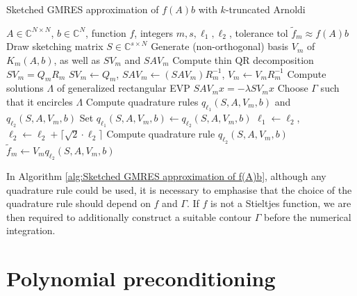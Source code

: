 \flushbottom
\begin{algorithm}[H]
    \caption{Sketched GMRES approximation of $f(A)b$ with $k$-truncated Arnoldi\cite{41}}
    \label{alg:Sketched GMRES approximation of f(A)b}
    \begin{algorithmic}[1]
        \REQUIRE $A \in \mathbb{C}^{N \times N}$, $b \in \mathbb{C}^{N}$, function $f$, integers $m, s, \ell_1, \ell_2$, tolerance $\text{tol}$
        \ENSURE $\tilde{f}_m \approx f(A)b$
        \STATE Draw sketching matrix $S \in \mathbb{C}^{s \times N}$
        \STATE Generate (non-orthogonal) basis $V_m$ of $K_m(A, b)$, as well as $SV_m$ and $SAV_m$
        \STATE Compute thin QR decomposition $SV_m = Q_mR_m$ 
        \STATE $SV_m \gets Q_m$, $SAV_m \gets (SAV_m)R_m^{-1}$, $V_m \gets V_mR_m^{-1}$ 
            \STATE Compute solutions $\Lambda$ of generalized rectangular EVP $SAV_m x = -\lambda SV_m x$
            \STATE Choose $\Gamma$ such that it encircles $\Lambda$
        \ENDIF
        \STATE Compute quadrature rules $q_{\ell_1}(S, A, V_m, b)$ and $q_{\ell_2}(S, A, V_m, b)$ 
            \STATE Set $q_{\ell_1}(S, A, V_m, b) \gets q_{\ell_2}(S, A, V_m, b)$ 
            \STATE $\ell_1 \gets \ell_2$, $\ell_2 \gets \ell_2 + \lceil \sqrt{2} \cdot \ell_2 \rceil$ 
            \STATE Compute quadrature rule $q_{\ell_2}(S, A, V_m, b)$
        \ENDWHILE
        \STATE $\tilde{f}_m \gets V_m q_{\ell_2}(S, A, V_m, b)$
    \end{algorithmic}
\end{algorithm}


In Algorithm \ref{alg:Sketched GMRES approximation of f(A)b}, although any quadrature rule could be used, it is necessary to emphasise that the choice of the quadrature rule should depend on $f$ and $\Gamma$. If $f$ is not a Stieltjes function, we are then required to additionally construct a suitable contour $\Gamma$ before the numerical integration.


\section{Polynomial preconditioning} 
\label{sec:poly_pre_cond}

